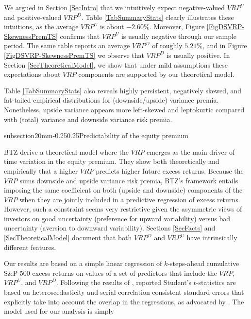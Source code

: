 \documentclass[11pt]{article}
\makeatletter
\renewcommand\subsection{\@startsection%
    {subsection}{2}{0mm}{-0.25\baselineskip}{0.25\baselineskip}{\bfseries\large}}
\makeatother
\begin{document}
We argued in Section \ref{SecIntro} that we intuitively expect negative-valued $VRP^U$ and positive-valued $VRP^D$. Table \ref{TabSummaryStats} clearly illustrates these intuitions, as the average $VRP^{U}$ is about $-2.60\%$. Moreover, Figure \ref{FigDSVRP-SkewnessPremTS} confirms that $VRP^{U}$ is usually negative through our sample period. The same table reports an average $VRP^D$ of roughly $5.21\%$, and in Figure \ref{FigDSVRP-SkewnessPremTS} we observe that $VRP^{D}$ is usually positive. In Section \ref{SecTheoreticalModel}, we show that under mild assumptions these expectations about $VRP$ components are supported by our theoretical model.

Table \ref{TabSummaryStats} also reveals highly persistent, negatively skewed, and fat-tailed empirical distributions for (downside/upside) variance premia. Nonetheless, upside variance appears more left-skewed and leptokurtic compared with (total) variance and downside variance risk premia.

\subsection{Predictability of the equity premium}\label{SecPredictEquityPremium}

BTZ derive a theoretical model where the $VRP$ emerges as the main driver of time variation in the equity premium. They show both theoretically and empirically that a higher $VRP$ predicts higher future excess returns. Because the $VRP$ sums downside and upside variance risk premia, BTZ's framework entails imposing the same coefficient on both (upside and downside) components of the $VRP$ when they are jointly included in a predictive regression of excess returns. However, such a constraint seems very restrictive given the asymmetric views of investors on good uncertainty (preference for upward variability) versus bad uncertainty (aversion to downward variability). Sections \ref{SecFacts} and \ref{SecTheoreticalModel} document that both $VRP^{D}$ and $VRP^{U}$ have intrinsically different features.

Our results are based on a simple linear regression of $k$-steps-ahead cumulative S\&P 500 excess returns on values of a set of predictors that include the $VRP$, $VRP^U$, and $VRP^D$. Following the results of \cite{AngBekaert07RFS}, reported Student's $t$-statistics are based on heteroscedasticity and serial correlation consistent standard errors that explicitly take into account the overlap in the regressions, as advocated by \cite{Hodrick92RFS}. The model used for our analysis is simply
\end{document}
